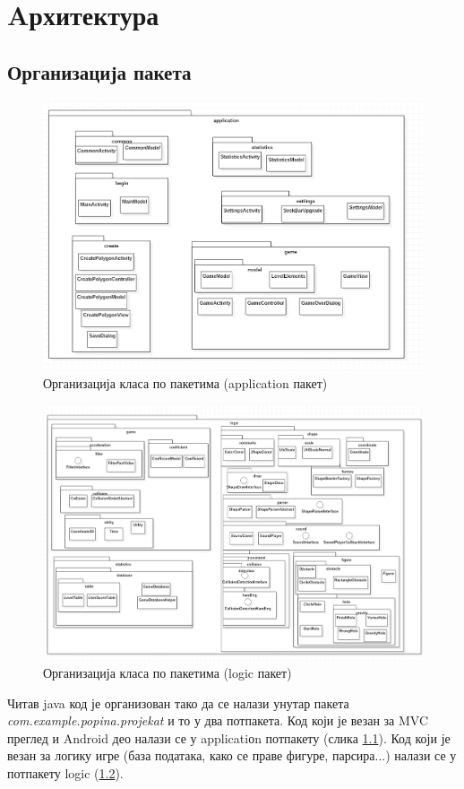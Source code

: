 \chapter{Aрхитектура} \label{Architecture}

\section{Организација пакета}

\begin{figure}[htb!]
\begin{center}
\includegraphics[scale=.7]{pictures/UML/package/application}
\caption{Организација класа по пакетима (application пакет)}\label{fig:umlPackageApp}
\end{center}
\end{figure}

\begin{figure}[htb!]
\begin{center}
\includegraphics[scale=.6]{pictures/UML/package/logic}
\caption{Организација класа по пакетима (logic пакет)}\label{fig:umlPackageLog}
\end{center}
\end{figure}

Читав java код је организован тако да се налази унутар пакета \emph{com.example.popina.projekat} и то у два потпакета. Код који је везан за MVC преглед и Android део налази се у applicatiоn потпакету (слика \ref{fig:umlPackageApp}). Код који је везан за логику игре (база података, како се праве фигуре, парсира...) налази се у потпакету logic (\ref{fig:umlPackageLog}).